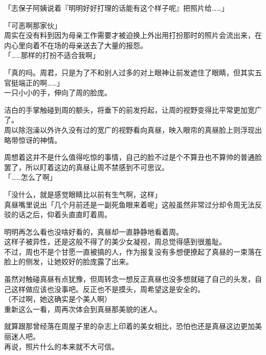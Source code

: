「志保子阿姨说着『明明好好打理的话能有这个样子呢』把照片给……」

「可恶啊那家伙」\\

周实在没有料到因为母亲工作需要才被迫换上外出用打扮那时的照片会流出来，在内心里向着不在场的母亲送去了大量的报怨。\\

「……那样的打扮不适合我啊」

「真的吗。周君，只是为了不和别人过多的对上眼神让前发遮住了眼睛，但其实五官挺端正的啊……」\\

一只小小的手，伸向了周的脸庞。

洁白的手掌触碰到周的额头，将垂下的前发捋起，让周的视野变得比平常更加宽广了。\\

周以除泡澡以外许久没有过的宽广的视野看向真昼，映入眼帘的真昼脸上则浮现出略带惊讶的神情。

周想着这并不是什么值得吃惊的事情，自己的脸不过是个不算丑也不算帅的普通脸罢了，所以盯着这边的真昼让周不禁感到不可思议。\\

「……怎么了啊」

「没什么，就是感觉眼睛比以前有生气啊，这样」\\

真昼嘴里说出「几个月前还是一副死鱼眼来着呢」这般虽然非常过分却令周无法反驳的话之后，仰着头直直盯着周。

明明再怎么看也没啥好看的，真昼却一直静静地看着周。\\

这样子被异性，还是这般不得了的美少女凝视，周总觉得感到很羞耻。\\

不过，周也不是个甘愿一直被搞的人，作为报复没有多想便撩起了真昼的一束落在脸上的侧发，让她姣好的脸庞露了出来。

虽然对触碰真昼有点犹豫，但周转念一想反正真昼也没多想就碰了自己的头发，自己这样做应该也没事吧。反正也不是摸头，周希望这是安全的。\\

（不过啊，她这确实是个美人啊）\\

重新这么一看，周再次体会到真昼那美貌的迷人。

就算跟那曾经落在周屋子里的杂志上印着的美女相比，恐怕也还是真昼这边更加美丽迷人吧。\\

再说，照片什么的本来就不大可信。

